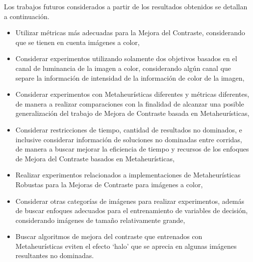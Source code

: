 Los trabajos futuros considerados a partir de los resultados obtenidos se detallan a continuación.

\begin{itemize}
	\item Utilizar métricas más adecuadas para la Mejora del Contraste, considerando que se tienen en cuenta imágenes a color,

	\item Considerar experimentos utilizando solamente dos objetivos basados en el canal de luminancia de la imagen a color, considerando algún canal que separe la información de intensidad de la información de color de la imagen,

	\item Considerar experimentos con Metaheurísticas diferentes y métricas diferentes, de manera a realizar comparaciones con la finalidad de alcanzar una posible generalización del trabajo de Mejora de Contraste basada en Metaheurísticas,

	\item Considerar restricciones de tiempo, cantidad de resultados no dominados, e inclusive considerar información de soluciones no dominadas entre corridas, de manera a buscar mejorar la eficiencia de tiempo y recursos de los enfoques de Mejora del Contraste basados en Metaheurísticas,

	\item Realizar experimentos relacionados a implementaciones de Metaheurísticas Robustas para la Mejoras de Contraste para imágenes a color,

	\item Considerar otras categorías de imágenes para realizar experimentos, además de buscar enfoques adecuados para el entrenamiento de variables de decisión, considerando imágenes de tamaño relativamente grande,

	\item Buscar algoritmos de mejora del contraste que entrenados con Metaheurísticas eviten el efecto `halo' que se aprecia en algunas imágenes resultantes no dominadas.

\end{itemize}


	
	
